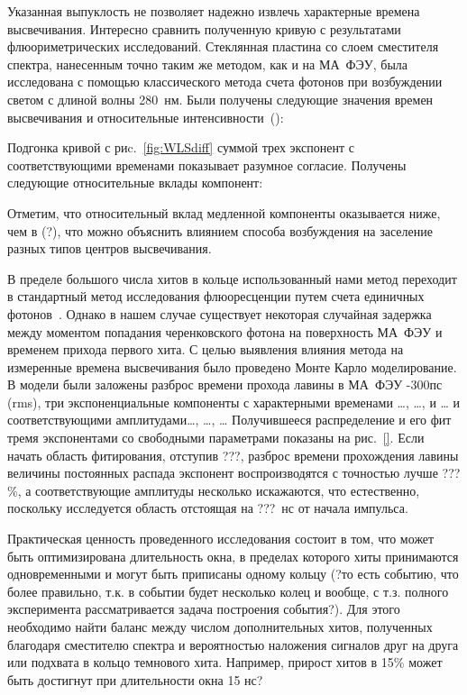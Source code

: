 Указанная выпуклость не позволяет надежно извлечь характерные времена высвечивания. Интересно сравнить полученную кривую с результатами флюориметрических исследований. Стеклянная пластина со слоем сместителя спектра, нанесенным точно таким же методом, как и на МА~ФЭУ, была исследована с помощью классического метода счета фотонов при возбуждении светом с длиной волны 280~нм. Были получены следующие значения времен высвечивания и относительные интенсивности~(\cite{DUERR}):


Подгонка кривой с риc.~\ref{fig:WLSdiff} суммой трех экспонент с соответствующими временами показывает разумное согласие. Получены следующие относительные вклады компонент: 


Отметим, что относительный вклад медленной компоненты оказывается ниже, чем в (?), что можно объяснить влиянием способа возбуждения на заселение разных типов центров высвечивания.

В пределе большого числа хитов в кольце использованный нами метод переходит в стандартный метод исследования флюоресценции путем счета единичных фотонов~\cite{}. Однако в нашем случае существует некоторая случайная задержка между моментом попадания черенковского фотона на поверхность МА~ФЭУ и временем прихода первого хита. С целью выявления влияния метода на измеренные времена высвечивания было проведено Монте Карло моделирование. В модели были заложены разброс времени прохода лавины в МА~ФЭУ -300пс (rms), три экспоненциальные компоненты с характерными временами …, …, и … и соответствующими амплитудами…, …, …
Получившееся распределение и его фит тремя экспонентами со свободными параметрами показаны на рис.~\ref{}. Если начать область фитирования, отступив ???, разброс времени прохождения лавины величины постоянных распада экспонент воспроизводятся с точностью лучше ???\%, а соответствующие амплитуды несколько искажаются, что естественно, поскольку исследуется область отстоящая на ???~нс от начала импульса.

Практическая ценность проведенного исследования состоит в том, что может быть оптимизирована длительность окна, в пределах которого хиты принимаются одновременными и могут быть приписаны одному кольцу (?то есть событию, что более правильно, т.к. в событии будет несколько колец и вообще, с т.з. полного эксперимента рассматривается задача построения события?). Для этого необходимо найти баланс между числом дополнительных хитов, полученных благодаря сместителю спектра и вероятностью наложения сигналов друг на друга или подхвата в кольцо темнового хита.
Например, прирост хитов в 15\% может быть достигнут при длительности окна 15 нс?